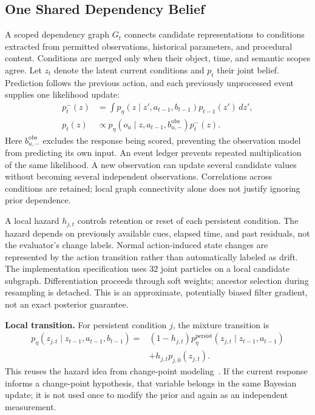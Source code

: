\documentclass[sigconf,anonymous,review]{acmart}
\theoremstyle{zhplain}
\begin{document}
\subsection{One Shared Dependency Belief}
A scoped dependency graph \(G_t\) connects candidate representations to conditions extracted from permitted observations, historical parameters, and procedural content. Conditions are merged only when their object, time, and semantic scopes agree. Let \(z_t\) denote the latent current conditions and \(p_t\) their joint belief. Prediction follows the previous action, and each previously unprocessed event supplies one likelihood update:
\begin{equation}
\begin{aligned}
p_t^-(z)&=\int p_{\eta}(z\mid z',a_{t-1},b_{t-1})p_{t-1}(z')\,dz',\\
p_t(z)&\propto p_{\eta}(o_u\mid z,a_{t-1},b_{u,-}^{\mathrm{obs}})p_t^-(z).
\end{aligned}
\label{eq:filter}
\end{equation}
Here \(b_{u,-}^{\mathrm{obs}}\) excludes the response being scored, preventing the observation model from predicting its own input. An event ledger prevents repeated multiplication of the same likelihood. A new observation can update several candidate values without becoming several independent observations. Correlations across conditions are retained; local graph connectivity alone does not justify ignoring prior dependence.

A local hazard \(h_{j,t}\) controls retention or reset of each persistent condition. The hazard depends on previously available cues, elapsed time, and past residuals, not the evaluator's change labels. Normal action-induced state changes are represented by the action transition rather than automatically labeled as drift. The implementation specification uses 32 joint particles on a local candidate subgraph. Differentiation proceeds through soft weights; ancestor selection during resampling is detached. This is an approximate, potentially biased filter gradient, not an exact posterior guarantee.

\textbf{Local transition.} For persistent condition \(j\), the mixture transition is
\begin{equation}
\begin{aligned}
p_\eta(z_{j,t}\mid z_{t-1},a_{t-1},b_{t-1})
={}&(1-h_{j,t})p_\eta^{\mathrm{persist}}(z_{j,t}\mid z_{t-1},a_{t-1})\\
&+h_{j,t}p_{j,0}(z_{j,t}).
\end{aligned}
\end{equation}
This reuses the hazard idea from change-point modeling~\cite{bocpd}. If the current response informs a change-point hypothesis, that variable belongs in the same Bayesian update; it is not used once to modify the prior and again as an independent measurement.
\end{document}
